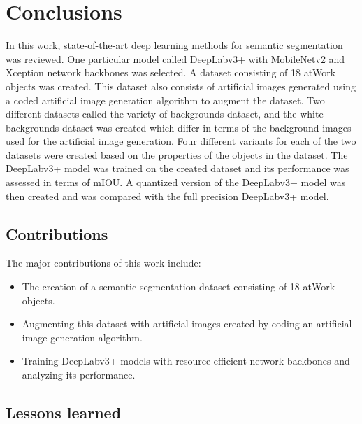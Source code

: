 
\chapter{Conclusions}

In this work, state-of-the-art deep learning methods for semantic segmentation was reviewed. One particular model called DeepLabv3+ with MobileNetv2 and Xception network backbones was selected. A dataset consisting of 18 atWork objects was created. This dataset also consists of artificial images generated using a coded artificial image generation algorithm to augment the dataset. Two different datasets called the variety of backgrounds dataset, and the white backgrounds dataset was created which differ in terms of the background images used for the artificial image generation. Four different variants for each of the two datasets were created based on the properties of the objects in the dataset. The DeepLabv3+ model was trained on the created dataset and its performance was assessed in terms of mIOU. A quantized version of the DeepLabv3+ model was then created and was compared with the full precision DeepLabv3+ model.

\section{Contributions}

The major contributions of this work include:
	\begin{itemize}
		\item The creation of a semantic segmentation dataset consisting of 18 atWork objects.
		\item Augmenting this dataset with artificial images created by coding an artificial image generation algorithm.
		\item Training DeepLabv3+ models with resource efficient network backbones and analyzing its performance.
	\end{itemize}

\section{Lessons learned}

